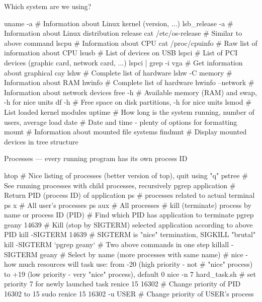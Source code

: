 \documentclass[compress, ucs, xelatex, 11pt, xcolor=svgnames,
  hyperref={
    bookmarks=true,
    unicode=true,
    colorlinks=true,
    pdftitle={Linux, command line and MetaCentrum},
    plainpages=false,
    pdfauthor={Vojtech Zeisek},
    pdfsubject={Course about use of Linux command line, writing shell scripts and using MetaCentrum of CESNET},
    pdfcreator={XeLaTeX},
    pdfkeywords={Linux, GNU, BASH, shell, command line, MetaCentrum},
    linkcolor=DarkRed,
    anchorcolor=DarkBlue,
    citecolor=Indigo,
    filecolor=NavyBlue,
    menucolor=DarkMagenta,
    urlcolor=DarkBlue,
    pdftex},
  url={hyphens, lowtilde} %
  ]{beamer}
\begin{document}
\begin{frame}[fragile]{Which system are we using?}
  \begin{bashcode}
    uname -a # Information about Linux kernel (version, ...)
    lsb_release -a # Information about Linux distribution release
    cat /etc/os-release # Similar to above command
    lscpu # Information about CPU
    cat /proc/cpuinfo # Raw list of information about CPU
    lsusb # List of devices on USB
    lspci # List of PCI devices (graphic card, network card, ...)
    lspci | grep -i vga # Get information about graphical cay
    lshw # Complete list of hardware
    lshw -C memory # Information about RAM
    hwinfo # Complete list of hardware
    hwinfo --network # Information about network devices
    free -h # Available memory (RAM) and swap, -h for nice units
    df -h # Free space on disk partitions, -h for nice units
    lsmod # List loaded kernel modules
    uptime # How long is the system running, number of users, average load
    date # Date and time - plenty of options for formatting
    mount # Information about mounted file systems
    findmnt # Display mounted devices in tree structure
  \end{bashcode}
\end{frame}

\begin{frame}[fragile]{Processes --- every running program has its own process ID}
  \begin{bashcode}
    htop # Nice listing of processes (better version of top), quit using "q"
    pstree # See running processes with child processes, recursively
    pgrep application # Return PID (process ID) of application
    ps # processes related to actual terminal
    ps x # All user's processes
    ps aux # All processes
    # kill (terminate) process by name or process ID (PID)
    # Find which PID has application to terminate
    pgrep geany
    14639
    # Kill (stop by SIGTERM) selected application according to above PID
    kill -SIGTERM 14639 # SIGTERM is "nice" termination, SIGKILL "brutal"
    kill -SIGTERM `pgrep geany` # Two above commands in one step
    killall -SIGTERM geany # Select by name (more processes with same name)
    # nice - how much resources will task use: from -20 (high priority - not
    # "nice" process) to +19 (low priority - very "nice" process), default 0
    nice -n 7 hard_task.sh # set priority 7 for newly launched task
    renice 15 16302 # Change priority of PID 16302 to 15
    sudo renice 15 16302 -u USER # Change priority of USER's process
  \end{bashcode}
\end{frame}
\end{document}
